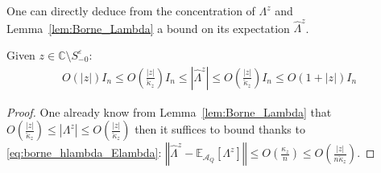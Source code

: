 \documentclass[a4papaer, titlepage]{book}
\begin{document}
One can directly deduce from the concentration of $\Lambda^z$ and Lemma~\ref{lem:Borne_Lambda} a bound on its expectation $\hat \Lambda^z$.
\begin{lemma}\label{lem:Borne_Lambda_hat}
  Given $z \in \mathbb C \setminus S_{-0}^\varepsilon$: %
  \begin{align*}
    O \left(|z|\right) I_n \leq O \left(\frac{|z|}{\check \kappa_z}\right) I_n\leq \left\vert \hat \Lambda^z  \right\vert\leq  O \left(\frac{|z|}{\check \kappa_z}\right)I_n\leq O \left(1 +|z|\right)I_n
 \end{align*}
  
\end{lemma}
\begin{proof}%
One already know from Lemma~\ref{lem:Borne_Lambda} that $O \left(\frac{|z|}{\check \kappa_z}\right) \leq \left\vert \Lambda^z  \right\vert\leq  O \left(\frac{|z|}{\check \kappa_z}\right)$ then it suffices to bound thanks to \eqref{eq:borne_hlambda_Elambda}: $\left\Vert \hat \Lambda^z - \mathbb E_{\mathcal A_Q} [\Lambda^z]\right\Vert \leq O \left(\frac{\kappa_z}{n}  \right) \leq O \left(\frac{|z|}{n\check \kappa_z}\right)$.
\end{proof}
\end{document}
